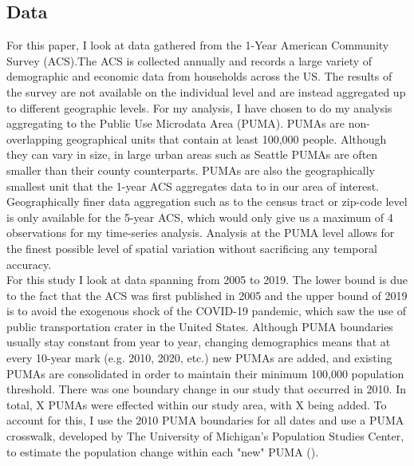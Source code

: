 \documentclass[A4paper,12pt]{article}
\begin{document}
\subsection{Data}

For this paper, I look at data gathered from the 1-Year American Community Survey (ACS).The ACS is collected annually and records a large variety of demographic and economic data from households across the US. The results of the survey are not available on the individual level and are instead aggregated up to different geographic levels. For my analysis, I have chosen to do my analysis aggregating to the Public Use Microdata Area (PUMA). PUMAs are non-overlapping geographical units that contain at least 100,000 people. Although they can vary in size, in large urban areas such as Seattle PUMAs are often smaller than their county counterparts. PUMAs are also the geographically smallest unit that the 1-year ACS aggregates data to in our area of interest. Geographically finer data aggregation such as to the census tract or zip-code level is only available for the 5-year ACS, which would only give us a maximum of 4 observations for my time-series analysis. Analysis at the PUMA level allows for the finest possible level of spatial variation without sacrificing any temporal accuracy.\\

For this study I look at data spanning from 2005 to 2019. The lower bound is due to the fact that the ACS was first published in 2005 and the upper bound of 2019 is to avoid the exogenous shock of the COVID-19 pandemic, which saw the use of public transportation crater in the United States. Although PUMA boundaries usually stay constant from year to year, changing demographics means that at every 10-year mark (e.g. 2010, 2020, etc.) new PUMAs are added, and existing PUMAs are consolidated in order to maintain their minimum 100,000 population threshold. There was one boundary change in our study that occurred in 2010. In total, X PUMAs were effected within our study area, with X being added. To account for this, I use the 2010 PUMA boundaries for all dates and use a PUMA crosswalk, developed by The University of Michigan's Population Studies Center, to estimate the population change within each "new" PUMA (\cite{michigan_population_study_center_creating_2020}). \\
\end{document}
